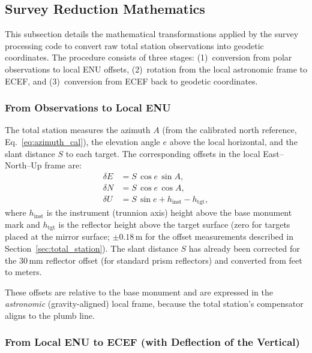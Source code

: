 
\subsection{Survey Reduction Mathematics}
\label{sec:survey_math}

This subsection details the mathematical transformations applied by the survey processing code to convert raw total station observations into geodetic coordinates. The procedure consists of three stages: (1)~conversion from polar observations to local ENU offsets, (2)~rotation from the local astronomic frame to ECEF, and (3)~conversion from ECEF back to geodetic coordinates.

\subsubsection{From Observations to Local ENU}

The total station measures the azimuth $A$ (from the calibrated north reference, Eq.~\ref{eq:azimuth_cal}), the elevation angle $e$ above the local horizontal, and the slant distance $S$ to each target. The corresponding offsets in the local East--North--Up frame are:
\begin{align}
\delta E &= S\,\cos e\,\sin A, \label{eq:obs2enu_E}\\
\delta N &= S\,\cos e\,\cos A, \label{eq:obs2enu_N}\\
\delta U &= S\,\sin e + h_{\text{inst}} - h_{\text{tgt}}, \label{eq:obs2enu_U}
\end{align}
where $h_{\text{inst}}$ is the instrument (trunnion axis) height above the base monument mark and $h_{\text{tgt}}$ is the reflector height above the target surface (zero for targets placed at the mirror surface; $\pm 0.18$\,m for the offset measurements described in Section~\ref{sec:total_station}). The slant distance $S$ has already been corrected for the 30\,mm reflector offset (for standard prism reflectors) and converted from feet to meters.

These offsets are relative to the base monument and are expressed in the \emph{astronomic} (gravity-aligned) local frame, because the total station's compensator aligns to the plumb line.

\subsubsection{From Local ENU to ECEF (with Deflection of the Vertical)}

